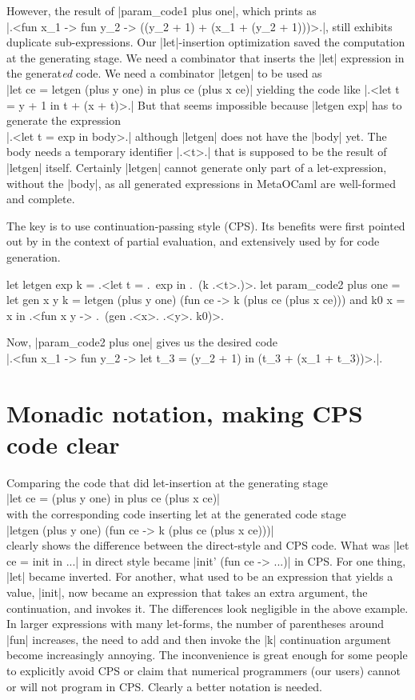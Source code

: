\documentclass{llncs}
\begin{document}
However, the result of |param_code1 plus one|, which prints as\\
|.<fun x_1 -> fun y_2 -> ((y_2 + 1) + (x_1 + (y_2 + 1)))>.|,
still exhibits duplicate sub-expressions. Our |let|-insertion
optimization saved the computation at the generating stage. 
We need a combinator that inserts the |let| expression in the
generat\emph{ed} code. We need a combinator |letgen| to be used
as\\|let ce = letgen (plus y one) in plus ce (plus x ce)| 
yielding the code like |.<let t = y + 1 in t + (x + t)>.|
But that seems impossible because |letgen exp| has to generate
the expression\\|.<let t = exp in body>.| although |letgen| does not have
the |body| yet. The body needs a temporary identifier |.<t>.| that
is supposed to be the result of |letgen| itself. 
Certainly |letgen| cannot generate only part of a let-expression,
without the |body|,  as all generated expressions in
MetaOCaml are well-formed and complete.

The key is to use continuation-passing style (CPS). Its benefits were first
pointed out by \cite{Bondorf:92} in the context
of partial evaluation, and extensively used by \cite{KiselyovTaha} for code
generation.

\begin{code}
let letgen exp k = .<let t = .~exp in .~(k .<t>.)>.
let param_code2 plus one =
  let gen x y k = letgen (plus y one) (fun ce -> k (plus ce (plus x ce)))
  and k0 x = x
  in .<fun x y -> .~(gen .<x>. .<y>. k0)>.
\end{code}

Now, |param_code2 plus one| gives us the desired code\\
|.<fun x_1 -> fun y_2 -> let t_3 = (y_2 + 1) in (t_3 + (x_1 + t_3))>.|.

\section{Monadic notation, making CPS code clear}\label{monadicnotation}

Comparing the code that did let-insertion at the generating stage\\
|let ce = (plus y one) in  plus ce (plus x ce)|\\
with the corresponding code inserting let at the generated code stage\\
|letgen (plus y one) (fun ce -> k (plus ce (plus x ce)))|\\
clearly shows the difference between the direct-style and CPS code.
What was |let ce = init in ...| in direct style became
|init' (fun ce -> ...)| in CPS. For one thing, |let| became
inverted. For another, what used to be an expression that yields
a value, |init|, now became an expression that takes an extra argument,
the continuation, and invokes it. The differences look negligible in
the above example. In larger expressions with many let-forms, the
number of parentheses around |fun| increases, the need to add and
then invoke the |k| continuation argument become increasingly annoying. The
inconvenience is great enough for some people to explicitly avoid CPS
or claim that numerical programmers (our users) cannot or will not
program in CPS. Clearly a better notation is needed.
\end{document}
